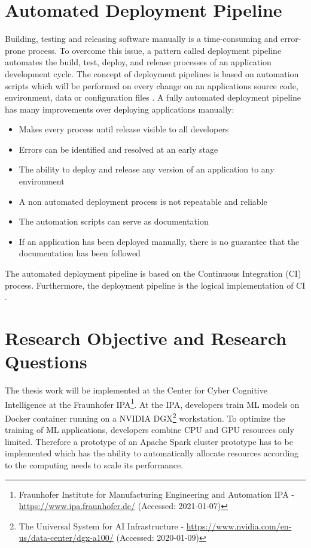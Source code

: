 \section{Automated Deployment Pipeline}
Building, testing and releasing software manually is a time-consuming and error-prone process.
To overcome this issue, a pattern called deployment pipeline automates the build, test, deploy, and release processes of an application development cycle.
The concept of deployment pipelines is based on automation scripts which will be performed on every change on an applications source code, environment, data or configuration files \cite{Farley2010CI}.
A fully automated deployment pipeline has many improvements over deploying applications manually:
\begin{itemize}
\item Makes every process until release visible to all developers \cite{Farley2010CI}
\item Errors can be identified and resolved at an early stage \cite{Farley2010CI}
\item The ability to deploy and release any version of an application to any environment \cite{Farley2010CI}
\item A non automated deployment process is not repeatable and reliable \cite{Farley2010CI}
\item The automation scripts can serve as documentation \cite{Farley2010CI}
\item If an application has been deployed manually, there is no guarantee that the documentation has been followed \cite{Farley2010CI}
\end{itemize}
The automated deployment pipeline is based on the Continuous Integration (CI) process. Furthermore, the deployment pipeline is the logical implementation of CI \cite{Farley2010CI}.


\section{Research Objective and Research Questions}
The thesis work will be implemented at the Center for Cyber Cognitive Intelligence at the Fraunhofer IPA\footnote{Fraunhofer Institute for Manufacturing Engineering and Automation IPA - \url{https://www.ipa.fraunhofer.de/} (Accessed: 2021-01-07)}.
At the IPA, developers train ML models on Docker container running on a NVIDIA DGX\footnote{The Universal System for AI Infrastructure - \url{https://www.nvidia.com/en-us/data-center/dgx-a100/} (Accessed: 2020-01-09)} workstation.
To optimize the training of ML applications, developers combine CPU and GPU resources only limited.
Therefore a prototype of an Apache Spark cluster prototype has to be implemented which has the ability to automatically allocate resources according to the computing needs to scale its performance.


